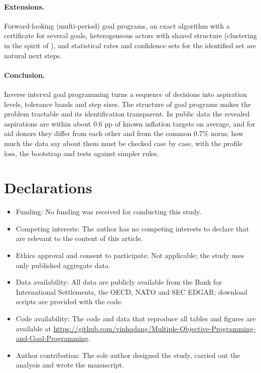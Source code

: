 \documentclass[pdflatex,sn-basic]{sn-jnl}
\theoremstyle{thmstyleone}\newtheorem{proposition}{Proposition}\newtheorem{theorem}{Theorem}
\theoremstyle{thmstylethree}\newtheorem{remark}{Remark}
\begin{document}
\paragraph{Extensions.} Forward-looking (multi-period) goal programs, an exact algorithm with a certificate for several goals, heterogeneous actors with shared structure (clustering in the spirit of \citet{carrizosa2026}), and statistical rates and confidence sets for the identified set are natural next steps.

\paragraph{Conclusion.} Inverse interval goal programming turns a sequence of decisions into aspiration levels, tolerance bands and step sizes. The structure of goal programs makes the problem tractable and its identification transparent. In public data the revealed aspirations are within about 0.6 pp of known inflation targets on average, and for aid donors they differ from each other and from the common 0.7\% norm; how much the data say about them must be checked case by case, with the profile loss, the bootstrap and tests against simpler rules.

\section*{Declarations}
\begin{itemize}
\item Funding: No funding was received for conducting this study.
\item Competing interests: The author has no competing interests to declare that are relevant to the content of this article.
\item Ethics approval and consent to participate: Not applicable; the study uses only published aggregate data.
\item Data availability: All data are publicly available from the Bank for International Settlements, the OECD, NATO and SEC EDGAR; download scripts are provided with the code.
\item Code availability: The code and data that reproduce all tables and figures are available at \url{https://github.com/vinhqdang/Multiple-Objective-Programming-and-Goal-Programming}.
\item Author contribution: The sole author designed the study, carried out the analysis and wrote the manuscript.
\end{itemize}
\end{document}
